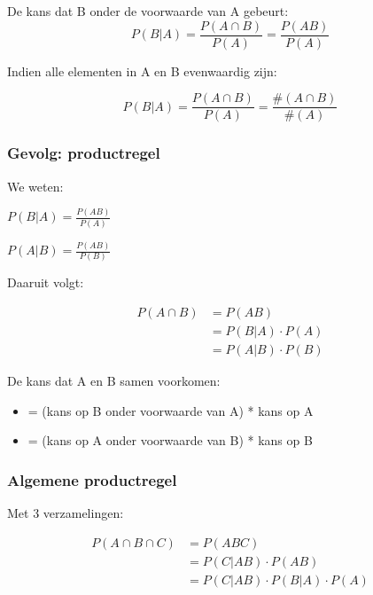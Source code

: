 \documentclass{article}
\begin{document}
De kans dat B onder de voorwaarde van A gebeurt:
\begin{equation}
    P(B | A) = \frac{P(A \cap B)}{P(A)} = \frac{P(AB)}{P(A)}
\end{equation}

Indien alle elementen in A en B evenwaardig zijn:

\begin{equation}
    P(B | A) = \frac{P(A \cap B)}{P(A)} = \frac{\#(A \cap B)}{\#(A)}
\end{equation}

\subsubsection{Gevolg: productregel}

We weten:

$P(B|A) = \frac{P(AB)}{P(A)}$

$P(A|B) = \frac{P(AB)}{P(B)}$

Daaruit volgt:

\begin{equation}
    \begin{aligned}
        P(A \cap B) &= P(AB)\\
        &= P (B|A) \cdot P(A)\\
        &= P (A|B) \cdot P(B)
    \end{aligned}
\end{equation}

De kans dat A en B samen voorkomen:

\begin{itemize}
    \item = (kans op B onder voorwaarde van A) * kans op A
    \item = (kans op A onder voorwaarde van B) * kans op B
\end{itemize}

\subsubsection{Algemene productregel}

Met 3 verzamelingen:

\begin{equation}
    \begin{split}
        P(A \cap B \cap C) & = P(ABC)\\
        & = P(C | AB) \cdot P(AB)\\
        & = P(C | AB) \cdot P (B|A) \cdot P(A) 
    \end{split}
\end{equation}
\end{document}

